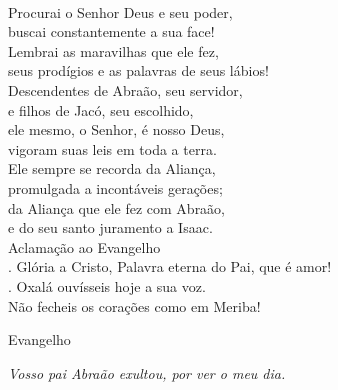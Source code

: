 \documentclass{book}
\begin{document}
\begin{flushleft}
    \vspace{.2cm} \\
    Procurai o Senhor Deus e seu poder, \textsuperscript{\gresixstar{}} \\
    buscai constantemente a sua face! \\
    Lembrai as maravilhas que ele fez, \textsuperscript{\gresixstar{}} \\
    seus prodígios e as palavras de seus lábios!
    \vspace{.2cm} \\
    Descendentes de Abraão, seu servidor, \textsuperscript{\gresixstar{}} \\
    e filhos de Jacó, seu escolhido, \\
    ele mesmo, o Senhor, é nosso Deus, \textsuperscript{\gresixstar{}} \\
    vigoram suas leis em toda a terra.
    \vspace{.2cm} \\
    Ele sempre se recorda da Aliança, \textsuperscript{\gresixstar{}} \\
    promulgada a incontáveis gerações; \\
    da Aliança que ele fez com Abraão, \textsuperscript{\gresixstar{}} \\
    e do seu santo juramento a Isaac.
    \vspace{.2cm} \\
    \textcolor{VioletRed2}{Aclamação ao Evangelho}
    \vspace{.2cm} \\
    {\color{VioletRed2} \Rbar.} Glória a Cristo, Palavra eterna do Pai, que é amor! \\
    {\color{VioletRed2} \Vbar.} Oxalá ouvísseis hoje a sua voz. \\
    Não fecheis os corações como em Meriba!
\end{flushleft}
\begin{center}
    \textcolor{VioletRed2}{Evangelho}
\end{center}
\begin{flushright}
    \textit{Vosso pai Abraão exultou, por ver o meu dia.}
\end{flushright}
\end{document}

